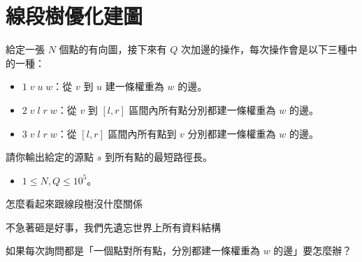 \section{線段樹優化建圖}

\begin{frame}{\ebtitle}
    \begin{problem}
        給定一張 $N$ 個點的有向圖，接下來有 $Q$ 次加邊的操作，每次操作會是以下三種中的一種：
        \begin{itemize}
            \item $1\;v\;u\;w$：從 $v$ 到 $u$ 建一條權重為 $w$ 的邊。
            \item $2\;v\;l\;r\;w$：從 $v$ 到 $[l,r]$ 區間內所有點分別都建一條權重為 $w$ 的邊。
            \item $3\;v\;l\;r\;w$：從 $[l,r]$ 區間內所有點到 $v$ 分別都建一條權重為 $w$ 的邊。
        \end{itemize}
        請你輸出給定的源點 $s$ 到所有點的最短路徑長。
        \begin{itemize}
            \item $1 \le N,Q \le 10^5$。
        \end{itemize}
    \end{problem}
\end{frame}

\begin{frame}{\ebtitle}
    怎麼看起來跟線段樹沒什麼關係

    不急著砸是好事，我們先遺忘世界上所有資料結構
\end{frame}

\begin{frame}{\ebtitle}
    如果每次詢問都是「一個點對所有點，分別都建一條權重為 $w$ 的邊」要怎麼辦？

    \begin{figure}[h!]
        \begin{center}
        \end{center}
    \end{figure}
\end{frame}

